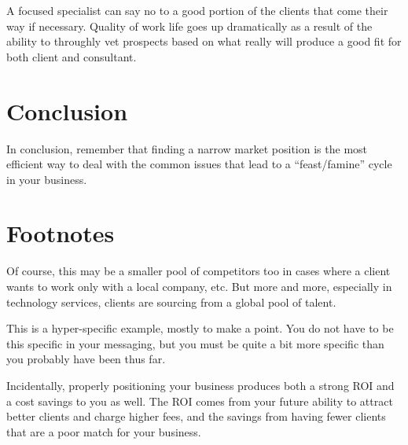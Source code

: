 A focused specialist can say no to a good portion of the clients that come their way if necessary. Quality of work life goes up dramatically as a result of the ability to throughly vet prospects based on what really will produce a good fit for both client and consultant.

\section{Conclusion}

In conclusion, remember that finding a narrow market position is the most efficient way to deal with the common issues that lead to a “feast/famine” cycle in your business.

\section{Footnotes}

Of course, this may be a smaller pool of competitors too in cases where a client wants to work only with a local company, etc. But more and more, especially in technology services, clients are sourcing from a global pool of talent.

This is a hyper-specific example, mostly to make a point. You do not have to be this specific in your messaging, but you must be quite a bit more specific than you probably have been thus far.

Incidentally, properly positioning your business produces both a strong ROI and a cost savings to you as well. The ROI comes from your future ability to attract better clients and charge higher fees, and the savings from having fewer clients that are a poor match for your business.